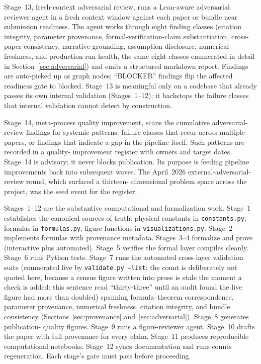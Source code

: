 \documentclass[11pt]{article}
\begin{document}
Stage~13, fresh-context adversarial review, runs a Lean-aware
adversarial reviewer agent in a fresh context window against each
paper or bundle near submission readiness. The agent works through
eight finding classes (citation integrity, parameter provenance,
formal-verification-claim substantiation, cross-paper
consistency, narrative grounding, assumption disclosure, numerical
freshness, and production-run health, the same eight classes
enumerated in detail in Section~\ref{sec:adversarial}) and emits
a structured markdown report.
Findings are auto-picked up as graph nodes; ``BLOCKER'' findings
flip the affected readiness gate to blocked. Stage~13 is meaningful
only on a codebase that already passes its own internal validation
(Stages~1--12); it backstops the failure classes that internal
validation cannot detect by construction.

Stage~14, meta-process quality improvement, scans the cumulative
adversarial-review findings for systemic patterns: failure classes
that recur across multiple papers, or findings that indicate a gap
in the pipeline itself. Such patterns are recorded in a quality-
improvement register with owners and target dates. Stage~14 is
advisory; it never blocks publication. Its purpose is feeding
pipeline improvements back into subsequent waves. The April~2026
external-adversarial-review round, which surfaced a thirteen-
dimensional problem space across the project, was the seed event
for the register.

Stages~1--12 are the substantive computational and formalization
work. Stage~1 establishes the canonical sources of truth: physical
constants in \texttt{constants.py}, formulas in
\texttt{formulas.py}, figure functions in \texttt{visualizations.py}.
Stage~2 implements formulas with provenance metadata. Stages~3--4
formalize and prove (interactive plus automated). Stage~5 verifies
the formal layer compiles cleanly. Stage~6 runs Python tests.
Stage~7 runs the automated cross-layer validation suite
(enumerated live by \texttt{validate.py --list}; the count is
deliberately not quoted here, because a census figure written into
prose is stale the moment a check is added: this sentence
read ``thirty-three'' until an audit found the live figure had
more than doubled)
spanning formula--theorem correspondence, parameter provenance,
numerical freshness, citation integrity, and bundle consistency
(Sections~\ref{sec:provenance} and~\ref{sec:adversarial}).
Stage~8 generates publication-
quality figures. Stage~9 runs a figure-reviewer agent. Stage~10
drafts the paper with full provenance for every claim. Stage~11
produces reproducible computational notebooks. Stage~12 syncs
documentation and runs counts regeneration. Each stage's gate must
pass before proceeding.
\end{document}
